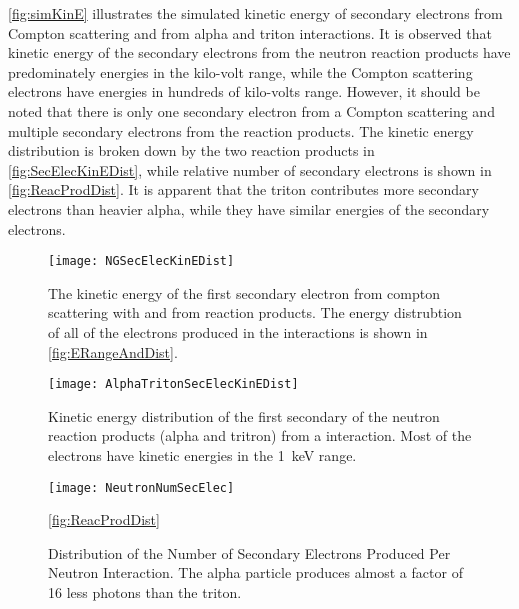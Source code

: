 \autoref{fig:simKinE} illustrates the simulated kinetic energy of secondary electrons from Compton scattering and from alpha and triton interactions.
It is observed that kinetic energy of the secondary electrons from the neutron reaction products have predominately energies in the kilo-volt range, while the Compton scattering electrons have energies in hundreds of kilo-volts range. 
However, it should be noted that there is only one secondary electron from a Compton scattering and multiple secondary electrons from the reaction products.
The kinetic energy distribution is broken down by the two reaction products in \autoref{fig:SecElecKinEDist}, while relative number of secondary electrons is shown in \autoref{fig:ReacProdDist}.
It is apparent that the triton contributes more secondary electrons than heavier alpha, while they have similar energies of the secondary electrons.
\begin{figure}[ht]
    \centering
    \texttt{[image: NGSecElecKinEDist]}
    \caption[Kinetic Energy of Primary Secondary Electron from Compton Scattering and Neutron Reaction Prodcuts]{The kinetic energy of the first secondary electron from compton scattering with  and from  reaction products. The energy distrubtion of all of the electrons produced in the interactions is shown in \autoref{fig:ERangeAndDist}.\EnergyDepSimGeo}
    \label{fig:simKinE}
\end{figure}
\begin{figure}
 	\centering
  	\texttt{[image: AlphaTritonSecElecKinEDist]}
	\caption[Kinetic Energy Distribution of Primary Secondary Electrons from the Neutron Reaction Products]{Kinetic energy distribution of the first secondary of the neutron reaction products (alpha and tritron) from a  interaction.  Most of the electrons have kinetic energies in the \SI{1}{\keV} range. \EnergyDepSimGeo}
	\label{fig:SecElecKinEDist}
\end{figure}
\begin{figure}
 	\centering
  	\texttt{[image: NeutronNumSecElec]}
	\caption[Distribution of the Number of Secondary Electrons Produced Per Neutron Interaction]{Distribution of the Number of Secondary Electrons Produced Per Neutron Interaction. The alpha particle produces almost a factor of 16 less photons than the triton. \EnergyDepSimGeo}
	\autoref{fig:ReacProdDist}
\end{figure}

